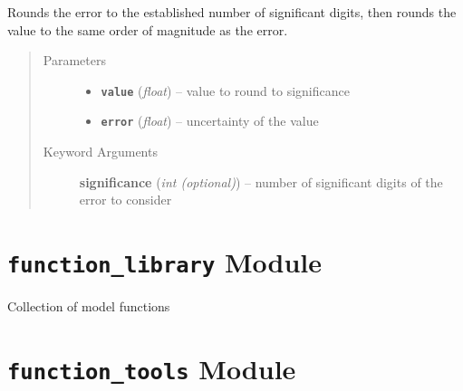 \documentclass[a4paper,10pt,english]{sphinxmanual}
\begin{document}

\begin{fulllineitems}
\label{index:kafe.fit.round_to_significance}
Rounds the error to the established number of significant digits, then
rounds the value to the same order of magnitude as the error.
\begin{quote}\begin{description}
\item[{Parameters}] \leavevmode\begin{itemize}
\item {} 
\textbf{\texttt{value}} (\emph{float}) -- value to round to significance

\item {} 
\textbf{\texttt{error}} (\emph{float}) -- uncertainty of the value

\end{itemize}

\item[{Keyword Arguments}] \leavevmode
\textbf{significance} (\emph{int (optional)}) --
number of significant digits of the error to consider

\end{description}\end{quote}

\end{fulllineitems}



\section{\texttt{function\_library} Module}
\label{index:module-kafe.function_library}\label{index:function-library-module}\label{index:module-function_library}
Collection of model functions


\section{\texttt{function\_tools} Module}
\label{index:module-kafe.function_tools}\label{index:function-tools-module}\label{index:module-function_tools}
\end{document}

